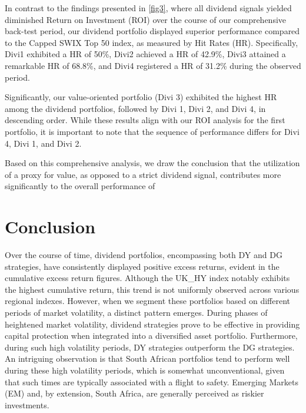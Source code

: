 \documentclass[11pt,preprint, authoryear]{elsarticle}
\numberwithin{equation}{section}
\numberwithin{figure}{section}
\numberwithin{table}{section}
\begin{document}
In contrast to the findings presented in \ref{fig3}, where all dividend
signals yielded diminished Return on Investment (ROI) over the course of
our comprehensive back-test period, our dividend portfolio displayed
superior performance compared to the Capped SWIX Top 50 index, as
measured by Hit Rates (HR). Specifically, Divi1 exhibited a HR of 50\%,
Divi2 achieved a HR of 42.9\%, Divi3 attained a remarkable HR of 68.8\%,
and Divi4 registered a HR of 31.2\% during the observed period.

Significantly, our value-oriented portfolio (Divi 3) exhibited the
highest HR among the dividend portfolios, followed by Divi 1, Divi 2,
and Divi 4, in descending order. While these results align with our ROI
analysis for the first portfolio, it is important to note that the
sequence of performance differs for Divi 4, Divi 1, and Divi 2.

Based on this comprehensive analysis, we draw the conclusion that the
utilization of a proxy for value, as opposed to a strict dividend
signal, contributes more significantly to the overall performance of

\newpage

\hypertarget{conclusion}{%
\section*{Conclusion}\label{conclusion}}

Over the course of time, dividend portfolios, encompassing both DY and
DG strategies, have consistently displayed positive excess returns,
evident in the cumulative excess return figures. Although the UK\_HY
index notably exhibits the highest cumulative return, this trend is not
uniformly observed across various regional indexes. However, when we
segment these portfolios based on different periods of market
volatility, a distinct pattern emerges. During phases of heightened
market volatility, dividend strategies prove to be effective in
providing capital protection when integrated into a diversified asset
portfolio. Furthermore, during such high volatility periods, DY
strategies outperform the DG strategies. An intriguing observation is
that South African portfolios tend to perform well during these high
volatility periods, which is somewhat unconventional, given that such
times are typically associated with a flight to safety. Emerging Markets
(EM) and, by extension, South Africa, are generally perceived as riskier
investments.
\end{document}
